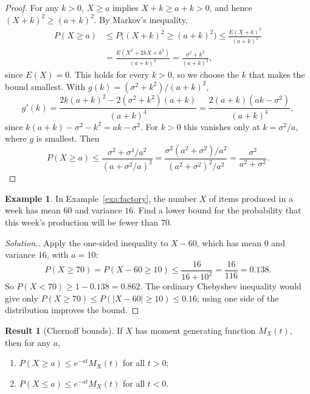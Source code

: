 \documentclass[11pt,a4paper]{article}
\theoremstyle{definition}
\newtheorem{exa}[thm]{Example}
\newtheorem{result}[thm]{Result}
\newenvironment{solution}
  {\renewcommand{\qedsymbol}{}\begin{proof}[\textit{Solution}.]}
  {\end{proof}}
\begin{document}
\begin{proof}
For any $k > 0$, $X \ge a$ implies $X + k \ge a + k > 0$, and hence $(X + k)^2 \ge (a + k)^2$. By Markov's inequality,
\begin{align*}
P(X \ge a) &\le P\bigl((X + k)^2 \ge (a + k)^2\bigr) \le \frac{E(X + k)^2}{(a + k)^2} \\
&= \frac{E(X^2 + 2kX + k^2)}{(a + k)^2} = \frac{\sigma^2 + k^2}{(a + k)^2} ,
\end{align*}
since $E(X) = 0$. This holds for every $k > 0$, so we choose the $k$ that makes the bound smallest. With $g(k) = (\sigma^2 + k^2)/(a + k)^2$,
\[
g'(k) = \frac{2k(a + k)^2 - 2(\sigma^2 + k^2)(a + k)}{(a + k)^4} = \frac{2(a + k)(ak - \sigma^2)}{(a + k)^4} ,
\]
since $k(a + k) - \sigma^2 - k^2 = ak - \sigma^2$. For $k > 0$ this vanishes only at $k = \sigma^2/a$, where $g$ is smallest. Then
\[
P(X \ge a) \le \frac{\sigma^2 + \sigma^4/a^2}{(a + \sigma^2/a)^2} = \frac{\sigma^2(a^2 + \sigma^2)/a^2}{(a^2 + \sigma^2)^2/a^2} = \frac{\sigma^2}{a^2 + \sigma^2} .
\]
\end{proof}

\begin{exa}\label{exa:factory-one-sided}
In Example~\ref{exa:factory}, the number $X$ of items produced in a week has mean $60$ and variance $16$. Find a lower bound for the probability that
this week's production will be fewer than $70$.
\end{exa}

\begin{solution}
Apply the one-sided inequality to $X - 60$, which has mean $0$ and variance $16$, with $a = 10$:
\[
P(X \ge 70) = P(X - 60 \ge 10) \le \frac{16}{16 + 10^2} = \frac{16}{116} = 0.138 .
\]
So $P(X < 70) \ge 1 - 0.138 = 0.862$. The ordinary Chebyshev inequality would give only $P(X \ge 70) \le P(|X - 60| \ge 10) \le 0.16$; using one side of the
distribution improves the bound.
\end{solution}

\begin{result}[Chernoff bounds]\label{res:chernoff}
If $X$ has moment generating function $M_X(t)$, then for any $a$,
\begin{enumerate}[label=(\roman*)]
\item $P(X \ge a) \le e^{-at}M_X(t)$ for all $t > 0$;
\item $P(X \le a) \le e^{-at}M_X(t)$ for all $t < 0$.
\end{enumerate}
\end{result}
\end{document}
